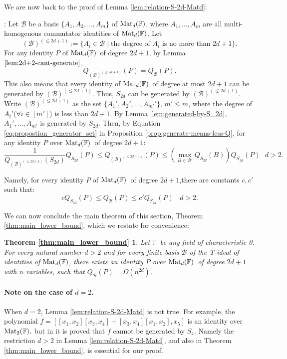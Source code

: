\documentclass[12pt,reqno]{article}
\newtheorem*{main-lower-bound}{Theorem \ref{thm:main_lower_bound}}
\newcommand\F{\ensuremath{\mathbb F}}
\newcommand {\para}[1] {\paragraph{#1}}
\newcommand{\matd}{{\ensuremath{{\rm Mat}_d(\F)}}}
\newenvironment{proof}{\QuadSpace\par\noindent{\bf Proof}:}{\EndProof\HalfSpace}
\newcommand{\QuadSpace}{\vspace{0.25\baselineskip}}
\newcommand{\HalfSpace}{\vspace{0.5\baselineskip}}
\newcommand{\EndProof}{ \hfill \vrule width 1ex height 1ex depth 0pt }
\newcommand{\degr}[2]{\left(#1\right)^{(#2)}}
\begin{document}
We are now  back to the proof of Lemma \ref{lem:relation-S-2d-Matd}:
\begin{proof}
Let $\mathcal B$ be a basis  $\{A_1,A_2,\ldots,A_m\}$ of $\matd$, where $A_1,\ldots,A_m$ are all multi-homogenous  commutator identities of \matd.
Let
$$
\degr{\mathcal B}{\leq 2d+1}:=\{A_i\in \mathcal B\;|\;\text{the degree of $A_i$ is no more than $2d+1$}\}.
$$
 For any identity $P$ of \matd\ of degree $2d+1$, by Lemma $\ref{lem:2d+2-cant-generate}$,
 $$Q_{\degr{\mathcal B}{\leq 2d+1}}(P)=Q_{\mathcal B}(P).$$
This also means that every identity of \matd \ of degree at most $2d+1$ can be generated by $\degr{\mathcal B}{\leq 2d+1}$. Thus,  $S_{2d}$ can be generated by $\degr{\mathcal B}{\leq 2d+1}$. Write $\degr{\mathcal B}{\leq 2d+1}$ as the set $\{A_1',A_2',\ldots, A_{m'}'\},\, m'\leq m$, where the degree of $A_i'$\;($\forall i\in[m']$) is less than $2d+1$. By Lemma \ref{lem:generated-by-S_2d}, $A_1',\ldots, A_{m'}$  is generated by $S_{2d}$.
Then, by Equation \ref{eq:propostion_generator_set}  in Proposition \ref{prop:generate-means-less-Q},  for any identity $P$ over \matd\ of   degree $2d+1$:   \begin{equation}\label{eq:count_constant_of_dimension_3}
  \frac{1}{Q_{\degr{\mathcal B}{\leq 2d+1}}(S_{2d})} Q_{S_{2d}}(P)\le Q_{\degr{\mathcal B}{\leq 2d+1}}(P)\le \left(\max_{B\in \mathcal B'}Q_{S_{2d}}(B)\right) Q_{S_{2d}}(P)~~~d>2.
\end{equation}

Namely, for every  identity  $P$  of \matd\ of degree  $2d+1$,there are constants $c,c'$ such that: $$c Q_{S_{2d}}(P)\le Q_{\mathcal B}(P)\le c' Q_{S_{2d}}(P)~~~~d>2.$$
\end{proof}

We can now conclude the main theorem of this section, Theorem \ref{thm:main_lower_bound}, which we restate for convenience:

\begin{main-lower-bound}
Let \F\ be any field of characteristic 0. For every natural number $d>2$ and for every finite basis \(\mathcal B\) of the T-ideal of identities of  \matd, there exists an identity \(P\) over \matd\ of degree $2d+1$ with $n$ variables, such that $Q_{\mathcal B}(P)=\Omega(n^{2d})$.
\end{main-lower-bound}

\para{Note on the case of $d=2$.}
When $d=2$,   Lemma \ref{lem:relation-S-2d-Matd} is not true. For example, the polynomial $f=[[x_1,x_2][x_3,x_4]+[x_3,x_4][x_1,x_2],x_5]$ is an identity over  ${\rm Mat}_2(\F),$ but in \cite{Ler73} it is proved that $f$ cannot be generated by $S_4$. Namely the restriction $d>2$ in Lemma \ref{lem:relation-S-2d-Matd}, and also in Theorem \ref{thm:main_lower_bound}, is essential for our proof.
\end{document}
